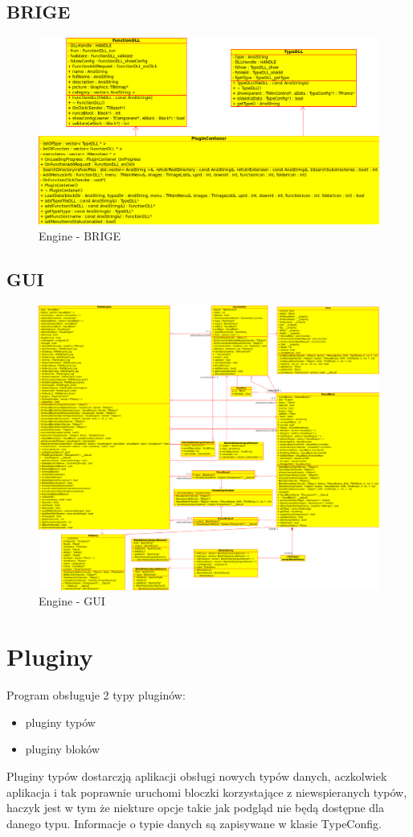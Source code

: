 \subsection{BRIGE}
\begin{figure}[h]
 \centering
 \includegraphics[scale=0.4]{diagram-brige.png}
 \caption{Engine - BRIGE}
 \label{fig:brige}
\end{figure}
\newpage
\subsection{GUI}
\begin{figure}[h]
 \centering
 \includegraphics[scale=0.3]{diagram-gui.png}
 \caption{Engine - GUI}
 \label{fig:gui}
\end{figure}
\newpage
\section{Pluginy}
Program obsługuje 2 typy pluginów:
\begin{itemize}
\item pluginy typów
\item pluginy bloków
\end{itemize}
Pluginy typów dostarczją aplikacji obsługi nowych typów danych, aczkolwiek aplikacja i tak poprawnie uruchomi bloczki korzystające z niewspieranych typów, haczyk jest w tym że niekture opcje takie jak podgląd nie będą dostępne dla danego typu.
Informacje o typie danych są zapisywane w klasie TypeConfig.\\

